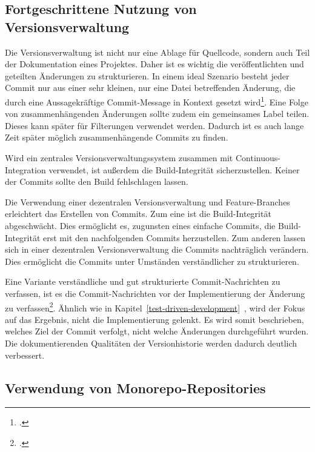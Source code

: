 \subsection{Fortgeschrittene Nutzung von Versionsverwaltung}

Die Versionsverwaltung ist nicht nur eine Ablage für Quellcode, sondern auch Teil der Dokumentation eines Projektes. Daher ist es wichtig die veröffentlichten und geteilten Änderungen zu strukturieren. In einem ideal Szenario besteht jeder Commit nur aus einer sehr kleinen, nur eine Datei betreffenden Änderung, die durch eine Aussagekräftige Commit-Message in Kontext gesetzt wird\footcite[vgl.][Kap. Making only one change per commit]{git-essentials-2017}. Eine Folge von zusammenhängenden Änderungen sollte zudem ein gemeinsames Label teilen. Dieses kann später für Filterungen verwendet werden. Dadurch ist es auch lange Zeit später möglich zusammenhängende Commits zu finden.

Wird ein zentrales Versionsverwaltungssystem zusammen mit Continuous-Integration verwendet, ist außerdem die Build-Integrität sicherzustellen. Keiner der Commits sollte den Build fehlschlagen lassen. 

Die Verwendung einer dezentralen Versionsverwaltung und Feature-Branches erleichtert das Erstellen von Commits. Zum eine ist die Build-Integrität abgeschwächt. Dies ermöglicht es, zugunsten eines einfache Commits, die Build-Integrität erst mit den nachfolgenden Commits herzustellen. Zum anderen lassen sich in einer dezentralen Versionsverwaltung die Commits nachträglich verändern. Dies ermöglicht die Commits unter Umständen verständlicher zu strukturieren.

Eine Variante verständliche und gut strukturierte Commit-Nachrichten zu verfassen, ist es die Commit-Nachrichten vor der Implementierung der Änderung zu verfassen\footcite[Writing commit messages before starting to code][]{git-essentials-2017}. Ähnlich wie in Kapitel~\ref{test-driven-development}~, wird der Fokus auf das Ergebnis, nicht die Implementierung gelenkt. Es wird somit beschrieben, welches Ziel der Commit verfolgt, nicht welche Änderungen durchgeführt wurden. Die dokumentierenden Qualitäten der Versionhistorie werden dadurch deutlich verbessert.

\subsection{Verwendung von Monorepo-Repositories}

